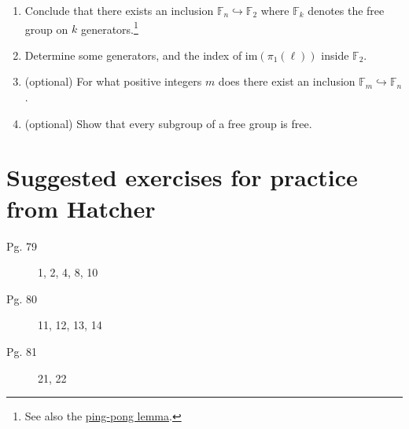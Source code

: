 \documentclass{article}
\begin{document}
\begin{enumerate}
\begin{enumerate}
  \item Conclude that there exists an
    inclusion $\mathbb{F}_n \hookrightarrow \mathbb{F}_2$ where $\mathbb{F}_k$ denotes the
    free group on $k$ generators.\footnote{See
      also the \href{https://en.wikipedia.org/wiki/Ping-pong_lemma}{ping-pong lemma}.}
  \item Determine some generators, and the index of $\mathrm{im}(\pi_1(\ell))$ inside
    $\mathbb{F}_2$.
  \item (optional) For what positive integers $m$ does there exist an inclusion
    $\mathbb{F}_m \hookrightarrow \mathbb{F}_n$.
  \item (optional) Show that every subgroup of a free group is free.  \end{enumerate}
\end{enumerate}

\newpage
\section*{Suggested exercises for practice from Hatcher}

\begin{description}
\item[Pg. 79] 1, 2, 4, 8, 10
\item[Pg. 80] 11, 12, 13, 14
\item[Pg. 81] 21, 22 
\end{description}
\end{document}
